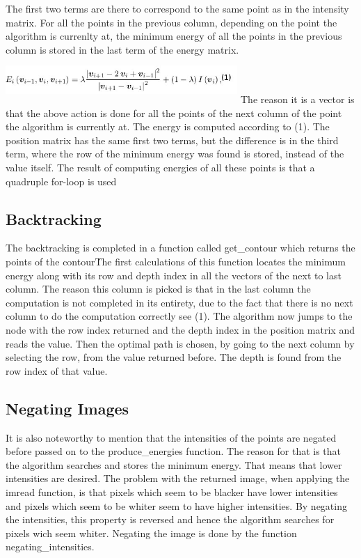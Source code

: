 \documentclass[12pt,a4paper,twocolumn]{article}
\begin{document}
The first two terms are there to correspond to the same point as in the intensity matrix. For all the points in the previous column, depending on the point the algorithm is currenlty at, the minimum energy of all the points in the previous column is stored in the last term of the energy matrix. 
\includegraphics[width=250pt,height=50pt,scale=1]{energy_eq.jpg}
The reason it is a vector is that the above action is done for all the points of the next column of the point the algorithm is currently at. The energy is computed according to (1). 
The position matrix has the same first two terms, but the difference is in the third term, where the row of the minimum energy was found is stored, instead of the value itself. The result of computing energies of all these points is that a quadruple for-loop is used
\subsection{Backtracking}
The backtracking is completed in a function called get\_contour which returns the points of the contour\. The first calculations of this function locates the minimum energy along with its row and depth index in all the vectors of the next to last column. The reason this column is picked is that in the last column the computation is not completed in its entirety, due to the fact that there is no next column to do the computation correctly see (1). The algorithm now jumps to the node with the row index returned and the depth index in the position matrix and reads the value. Then the optimal path is chosen, by going to the next column by selecting the row, from the value returned before. The depth is found from the row index of that value.
\subsection{Negating Images}
It is also noteworthy to mention that the intensities of the points are negated before passed on to the produce\_energies function. The reason for that is that the algorithm searches and stores the minimum energy. That means that lower intensities are desired. The problem with the returned image, when applying the imread function, is that pixels which seem to be blacker have lower intensities and pixels which seem to be whiter seem to have higher intensities. By negating the intensities, this property is reversed and hence the algorithm searches for pixels wich seem whiter. Negating the image is done by the function negating\_intensities.
\end{document}
